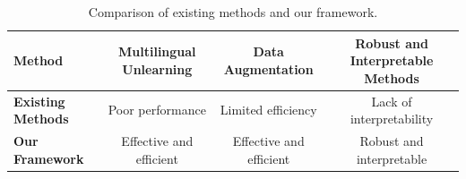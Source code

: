 \documentclass{article}
\begin{document}
\begin{table}[h]
\centering
\begin{tabular}{|l|c|c|c|}
\hline
\textbf{Method} & \textbf{Multilingual Unlearning} & \textbf{Data Augmentation} & \textbf{Robust and Interpretable Methods} \\
\hline
\textbf{Existing Methods} & Poor performance & Limited efficiency & Lack of interpretability \\
\hline
\textbf{Our Framework} & Effective and efficient & Effective and efficient & Robust and interpretable \\
\hline
\end{tabular}
\caption{Comparison of existing methods and our framework.}
\label{table:comparison}
\end{table}
\end{document}

